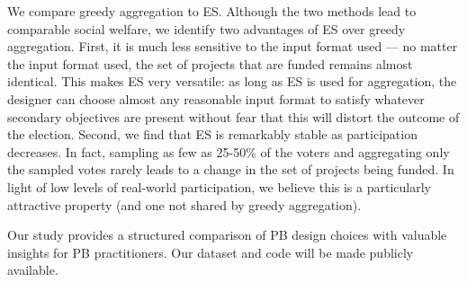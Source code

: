 \documentclass{comsoc2023}
\newcommand{\mes}{ES}
\begin{document}
We compare greedy aggregation to \mes{}. Although the two methods lead to comparable social welfare, we identify two  advantages of \mes{} over greedy aggregation. First, it is much less sensitive to the input format used --- no matter the input format used, the set of projects that are funded remains almost identical. This makes \mes{} very versatile: as long as \mes{} is used for aggregation, the designer can choose almost any reasonable input format to satisfy whatever secondary objectives are present without fear that this will distort the outcome of the election. Second, we find that \mes{} is remarkably stable as participation decreases. In fact, sampling as few as 25-50\% of the voters and aggregating only the sampled votes rarely leads to a change in the set of projects being funded. In light of low levels of real-world participation, we believe this is a particularly attractive property (and one  not shared by greedy aggregation). 

Our study provides  a structured comparison of PB design choices with valuable insights for PB practitioners.  Our dataset and code will be made publicly available. %


\end{document}
